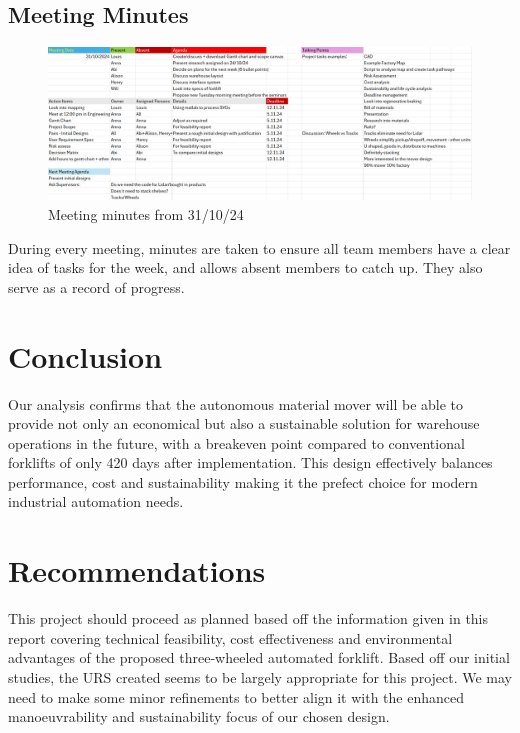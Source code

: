 \documentclass[12pt,titlepage]{article}
\begin{document}
 \subsection{Meeting Minutes}
 \begin{figure}[h]
    \includegraphics[width=1\textwidth]{HalloweenMinutes1.png}
    \caption{Meeting minutes from 31/10/24}
    \label{fig:y}
\end{figure}
  \FloatBarrier
During every meeting, minutes are taken to ensure all team members have a clear idea of tasks for the week, and allows absent members to catch up. They also serve as a record of progress.

\FloatBarrier

\section{Conclusion}
 Our analysis confirms that the autonomous material mover will be able to provide not only an economical but also a sustainable solution for warehouse operations in the future, with a breakeven point compared to conventional forklifts of only 420 days after implementation. This design effectively balances performance, cost and sustainability making it the prefect choice for modern industrial automation needs.

\section{Recommendations}
This project should proceed as planned based off the information given in this report covering technical feasibility, cost effectiveness and environmental advantages of the proposed three-wheeled automated forklift. Based off our initial studies, the URS created seems to be largely appropriate for this project. We may need to make some minor refinements to better align it with the enhanced manoeuvrability and sustainability focus of our chosen design.
\end{document}
